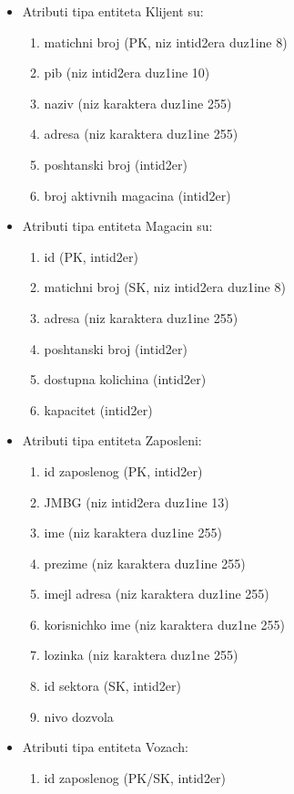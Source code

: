 \begin{itemize}
    \item 
Atributi tipa entiteta Klijent su:
\begin{enumerate}
    \item{matichni broj (PK, niz intid2era duz1ine 8)}
    \item{pib (niz intid2era duz1ine 10)}
    \item{naziv (niz karaktera duz1ine 255)}
    \item{adresa (niz karaktera duz1ine 255)}
    \item{poshtanski broj (intid2er)}
    \item{broj aktivnih magacina (intid2er)}
\end{enumerate}

\item
Atributi tipa entiteta Magacin su:
\begin{enumerate}
    \item{id (PK, intid2er)}
    \item{matichni broj (SK, niz intid2era duz1ine 8)}
    \item{adresa (niz karaktera duz1ine 255)}
    \item{poshtanski broj (intid2er)}
    \item{dostupna kolichina (intid2er)}
    \item{kapacitet (intid2er)}
\end{enumerate}
\item
Atributi tipa entiteta Zaposleni:
\begin{enumerate}
    \item {id zaposlenog (PK, intid2er)}
    \item{JMBG (niz intid2era duz1ine 13)}
    \item{ime (niz karaktera duz1ine 255)}
    \item{prezime (niz karaktera duz1ine 255)}
    \item{imejl adresa (niz karaktera duz1ine 255)}
    \item{korisnichko ime (niz karaktera duz1ne 255)}
    \item{lozinka (niz karaktera duz1ne 255)}
    \item{id sektora (SK, intid2er)}
    \item{nivo dozvola}
\end{enumerate}
\item
Atributi tipa entiteta Vozach:
\begin{enumerate}
    \item {id zaposlenog (PK/SK, intid2er)}

\end{enumerate}
\end{itemize}

